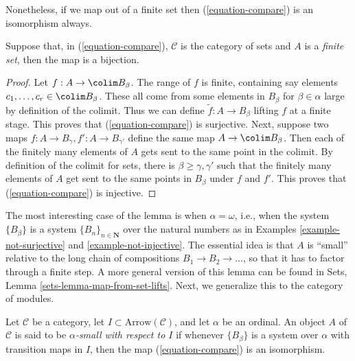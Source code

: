 \noindent
Nonetheless, if we map out of a finite set then
(\ref{equation-compare}) is an isomorphism always.

\begin{lemma}
\label{lemma-out-of-finite}
Suppose that, in (\ref{equation-compare}), $\mathcal{C}$ is the category
of sets and $A$ is a {\it finite set}, then the map is a bijection.
\end{lemma}

\begin{proof}
Let $f : A \to \colim B_\beta$.
The range of $f$ is finite, containing say
elements $c_1, \dots, c_r \in \colim B_\beta$.
These all come from some elements in $B_\beta$ for $\beta \in \alpha$
large by definition of the colimit. Thus we can define
$\widetilde{f} : A \to B_\beta$ lifting $f$ at a finite stage.
This proves that (\ref{equation-compare}) is surjective.
Next, suppose two maps $f : A \to B_\gamma, f' : A \to B_{\gamma'}$
define the same map $A \to \colim B_\beta$.
Then each of the finitely many elements of $A$ gets sent to the same point in
the colimit. By definition of the colimit for sets, there is
$\beta \geq \gamma, \gamma'$ such that the finitely many elements of
$A$ get sent to the same points in $B_\beta$ under $f$ and $f'$.
This proves that (\ref{equation-compare}) is injective.
\end{proof}

\noindent
The most interesting case of the lemma is when $\alpha = \omega$, i.e.,
when the system $\{B_\beta\}$ is a system $\{B_n\}_{n \in \mathbf{N}}$
over the natural numbers as in
Examples \ref{example-not-surjective} and
\ref{example-not-injective}.
The essential idea is that $A$ is ``small'' relative to the long chain of
compositions $B_1 \to B_2 \to \dots$, so that it has to factor through a
finite step. A more general version of this lemma can be found in
Sets, Lemma \ref{sets-lemma-map-from-set-lifts}.
Next, we generalize this to the category of modules.

\begin{definition}
\label{definition-small}
Let $\mathcal{C}$ be a category, let $I \subset \text{Arrow}(\mathcal{C})$,
and let $\alpha$ be an ordinal. An object $A$ of $\mathcal{C}$ is said to
be {\it $\alpha$-small with respect to $I$} if whenever $\{B_\beta\}$ is
a system over $\alpha$ with transition maps in $I$, then
the map (\ref{equation-compare}) is an isomorphism.
\end{definition}

